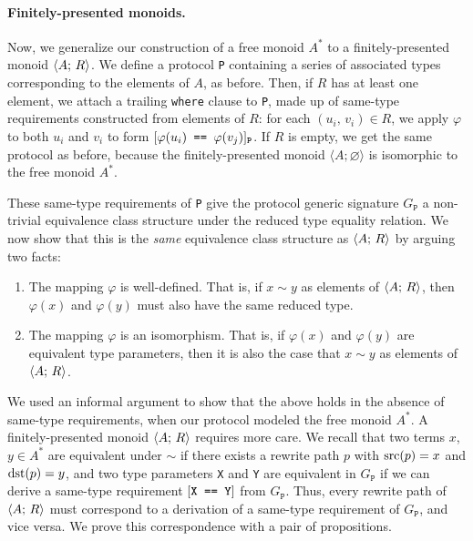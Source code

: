\documentclass[../generics]{subfiles}
\begin{document}
\paragraph{Finitely-presented monoids.}
Now, we generalize our construction of a free monoid $A^*$ to a finitely-presented monoid $\langle A;\,R\rangle$. We define a protocol \texttt{P} containing a series of associated types corresponding to the elements of $A$, as before. Then, if $R$ has at least one element, we attach a trailing \texttt{where} clause to \texttt{P}, made up of same-type requirements constructed from elements of $R$: for each $(u_i,\,v_i)\in R$, we apply $\varphi$ to both $u_i$ and $v_i$ to form $[\texttt{$\varphi(u_i)$ == $\varphi(v_j)$}]_\texttt{P}$. If $R$ is empty, we get the same protocol as before, because the finitely-presented monoid $\langle A;\varnothing\rangle$ is isomorphic to the free monoid $A^*$.

These same-type requirements of \texttt{P} give the protocol generic signature $G_\texttt{P}$ a non-trivial equivalence class structure under the reduced type equality relation. We now show that this is the \emph{same} equivalence class structure as $\langle A;\,R\rangle$ by arguing two facts:
\begin{enumerate}
\item The mapping $\varphi$ is well-defined. That is, if $x\sim y$ as elements of $\langle A;\,R\rangle$, then $\varphi(x)$ and $\varphi(y)$ must also have the same reduced type.
\item The mapping $\varphi$ is an isomorphism. That is, if $\varphi(x)$ and $\varphi(y)$ are equivalent type parameters, then it is also the case that $x\sim y$ as elements of $\langle A;\,R\rangle$.
\end{enumerate}
We used an informal argument to show that the above holds in the absence of same-type requirements, when our protocol modeled the free monoid $A^*$. A finitely-presented monoid $\langle A;\,R\rangle$ requires more care. We recall that two terms $x$, $y\in A^*$ are equivalent under $\sim$ if there exists a rewrite path $p$ with $\operatorname{src}(p)=x$ and $\operatorname{dst}(p)=y$, and two type parameters \texttt{X} and \texttt{Y} are equivalent in $G_\texttt{P}$ if we can derive a same-type requirement $[\texttt{X == Y}]$ from $G_\texttt{P}$. Thus, every rewrite path of $\langle A;\,R\rangle$ must correspond to a derivation of a same-type requirement of $G_\texttt{P}$, and vice versa. We prove this correspondence with a pair of propositions.
\end{document}
